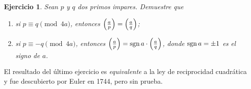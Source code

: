 \documentclass{article}
\theoremstyle{plain}
\newtheorem{ejerc}{Ejercicio}
\begin{document}
\begin{ejerc}
  Sean $p$ y $q$ dos primos impares. Demuestre que

  \begin{enumerate}
  \item[1)] si $p \equiv q \pmod{4a}$, entonces
    $\left(\frac{a}{p}\right) = \left(\frac{a}{q}\right)$;

  \item[2)] si $p \equiv -q \pmod{4a}$, entonces
    $\left(\frac{a}{p}\right) = \operatorname{sgn} a\cdot \left(\frac{a}{q}\right)$, donde $\operatorname{sgn} a = \pm 1$ es
    el signo de $a$.
  \end{enumerate}
\end{ejerc}

El resultado del último ejercicio es \emph{equivalente} a la ley de reciprocidad
cuadrática y fue descubierto por Euler en 1744, pero sin prueba.
\end{document}
